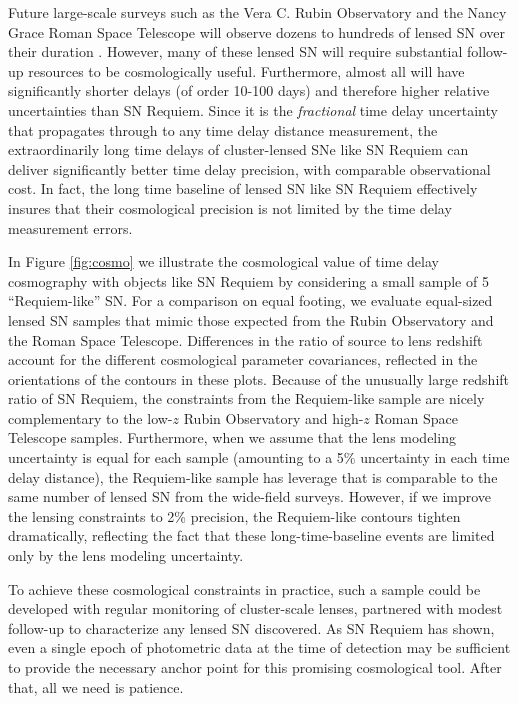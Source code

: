\documentclass[12pt,dvipsnames]{article}
\def\SNABC{SN Requiem\xspace}
\def\reqlike{Requiem-like\xspace}
\begin{document}
Future large-scale surveys such as the Vera C. Rubin Observatory 
and the Nancy Grace Roman Space Telescope will observe dozens to hundreds of lensed SN over their duration \cite{oguri_gravitationally_2010,goldstein_rates_2019,wojtak_magnified_2019}. However, many of these lensed SN will require substantial follow-up resources to be cosmologically useful. Furthermore, almost all will have significantly shorter 
delays (of order 10-100 days) and therefore higher relative uncertainties than SN Requiem.  Since it is the {\it fractional} time delay uncertainty that 
propagates through to any time delay distance measurement, the extraordinarily long time delays of cluster-lensed SNe like SN Requiem can deliver significantly better time delay precision, with comparable observational cost.  In fact, the long time baseline of lensed SN like \SNABC effectively insures that their cosmological precision is not limited by the time delay measurement errors.  

In Figure \ref{fig:cosmo} we illustrate the cosmological value of time delay cosmography with objects like \SNABC  by considering a small sample of 5 ``\reqlike'' SN.  For a comparison on equal footing, we evaluate equal-sized lensed SN samples 
that mimic those expected from the Rubin Observatory and  the Roman Space Telescope.  Differences in the 
ratio of source to lens redshift account for the different cosmological parameter covariances, reflected in the orientations of the contours in these plots. Because of the unusually large redshift ratio of SN Requiem, the constraints 
from the \reqlike sample are nicely complementary to the low-$z$ Rubin Observatory and high-$z$ Roman Space Telescope samples. 
Furthermore, when we assume that the lens modeling uncertainty is equal for each sample (amounting to a 5\% uncertainty in each time delay distance), the \reqlike sample has leverage that is comparable to the same number of lensed SN from the wide-field surveys. However, if we improve  the lensing constraints to 2\% precision, the \reqlike contours tighten dramatically, reflecting the fact that these long-time-baseline events are limited only by the lens modeling uncertainty.


To achieve these cosmological constraints in practice, such a sample could be developed with regular monitoring of cluster-scale lenses, partnered with modest follow-up to characterize any lensed SN discovered.  As \SNABC has shown, even a single epoch of photometric data at the time of detection may be sufficient to provide the necessary anchor point for this promising cosmological tool.  After that, all we need is patience.
\end{document}
